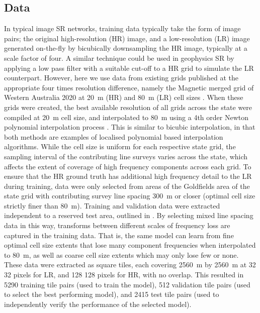 \documentclass[manuscript.tex]{subfiles}
\begin{document}
\subsection{Data}
In typical image SR networks, training data typically take the form of image pairs; the original high-resolution (HR) image, and a low-resolution (LR) image generated on-the-fly by bicubically downsampling the HR image, typically at a scale factor of four.
A similar technique could be used in geophysics SR by applying a low pass filter with a suitable cut-off to a HR grid to simulate the LR counterpart.
However, here we use data from existing grids published at the appropriate four times resolution difference, namely the Magnetic merged grid of Western Australia 2020 at \qty{20}{\metre} (HR) and \qty{80}{\metre} (LR) cell sizes \parencite{brett80MagneticMerged2020}.
When these grids were created, the best available resolution of all grids across the state were compiled at \qty{20}{\metre} cell size, and interpolated to \qty{80}{\metre} using a 4th order Newton polynomial interpolation process \parencite[][personal communication]{brett80MagneticMerged2020}.
This is similar to bicubic interpolation, in that both methods are examples of localised polynomial based interpolation algorithms.
While the cell size is uniform for each respective state grid, the sampling interval of the contributing line surveys varies across the state, which affects the extent of coverage of high frequency components across each grid.
To ensure that the HR ground truth has additional high frequency detail to the LR during training, data were only selected from areas of the Goldfields area of the state grid with contributing survey line spacing \qty{300}{\metre} or closer (optimal cell size strictly finer than \qty{80}{\metre}).
Training and validation data were extracted independent to a reserved test area, outlined in .
By selecting mixed line spacing data in this way, transforms between different scales of frequency loss are captured in the training data.
That is, the same model can learn from fine optimal cell size extents that lose many component frequencies when interpolated to \qty{80}{\metre}, as well as coarse cell size extents which may only lose few or none.
These data were extracted as square tiles, each covering \qty{2560}{\metre} by \qty{2560}{\metre} at 32 \texttimes{} 32 pixels for LR, and 128 \texttimes{} 128 pixels for HR, with no overlap.
This resulted in \num{5290} training tile pairs (used to train the model), \num{512} validation tile pairs (used to select the best performing model), and \num{2415} test tile pairs (used to independently verify the performance of the selected model).
\end{document}
